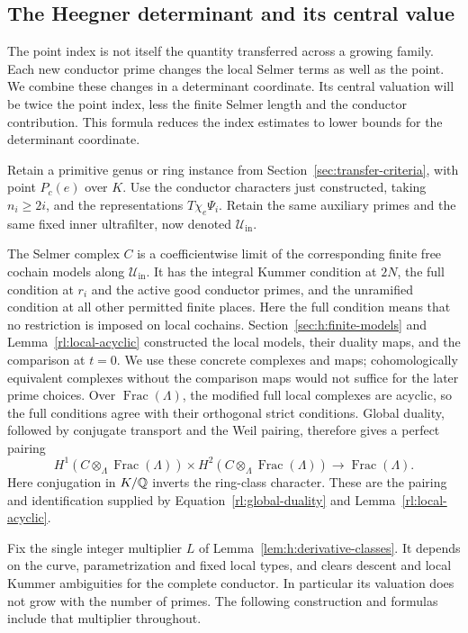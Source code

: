 \subsection{The Heegner determinant and its central value}\label{sec:h:specialization}

The point index is not itself the quantity transferred across a growing
family. Each new conductor prime changes the local Selmer terms as well
as the point. We combine these changes in a determinant coordinate.
Its central valuation will be twice the point index, less the finite
Selmer length and the conductor contribution. This formula reduces the
index estimates to lower bounds for the determinant coordinate.

Retain a primitive genus or ring instance from Section~\ref{sec:transfer-criteria},
with point $P_c(e)$ over $K$. Use the conductor characters just
constructed, taking $n_i\ge2i$, and the representations $T\chi_e\Psi_i$.
Retain the same auxiliary primes and the same fixed inner ultrafilter,
now denoted $\mathcal U_{\mathrm{in}}$.

The Selmer complex $C$ is a coefficientwise limit of the corresponding
finite free cochain models along $\mathcal U_{\mathrm{in}}$. It has the integral Kummer condition at
$2N$, the full condition at $r_i$ and the active good conductor primes,
and the unramified condition at all other permitted finite places.
Here the full condition means that no restriction is imposed on local
cochains. Section~\ref{sec:h:finite-models} and Lemma~\ref{rl:local-acyclic}
constructed the local models, their duality maps, and the comparison
at $t=0$. We use these concrete complexes and maps;
cohomologically equivalent complexes without the comparison maps would
not suffice for the later prime choices. Over
$\operatorname{Frac}(\Lambda)$, the modified full local complexes
are acyclic, so the full conditions agree with their orthogonal strict
conditions. Global duality, followed by conjugate transport and the
Weil pairing, therefore gives a perfect pairing
\[
 H^1(C\otimes_\Lambda\operatorname{Frac}(\Lambda))\times H^2(C\otimes_\Lambda\operatorname{Frac}(\Lambda))
 \longrightarrow\operatorname{Frac}(\Lambda).
\]
Here conjugation in $K/\mathbb Q$ inverts the ring-class character. These are
the pairing and identification supplied by
Equation~\eqref{rl:global-duality} and Lemma~\ref{rl:local-acyclic}.

Fix the single integer multiplier $L$ of
Lemma~\ref{lem:h:derivative-classes}. It depends on the curve,
parametrization and fixed local types, and clears descent and local
Kummer ambiguities for the complete conductor. In particular its
valuation does not grow with the number of primes. The following
construction and formulas include that multiplier throughout.

